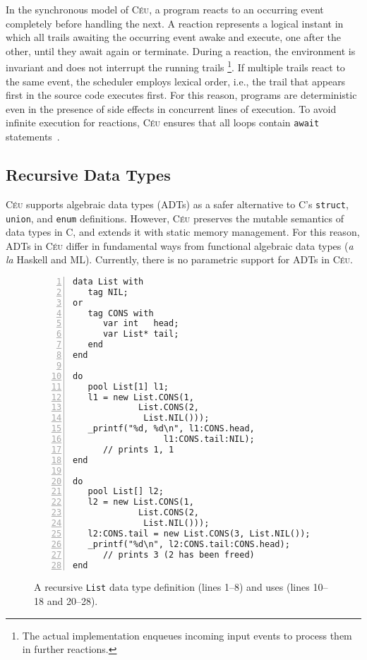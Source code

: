 \documentclass{acm_proc_article-sp}
\newcommand{\CEU}{\textsc{C\'{e}u}\xspace}
\newcommand{\code}[1] {{\small{\texttt{#1}}}}
\begin{document}
In the synchronous model of \CEU, a program reacts to an occurring event 
completely before handling the next.
%
A reaction represents a logical instant in which all trails awaiting the 
occurring event awake and execute, one after the other, until they await again 
or terminate.
%
During a reaction, the environment is invariant and does not interrupt the 
running trails%
\footnote{
The actual implementation enqueues incoming input events to process them in 
further reactions.
}.
If multiple trails react to the same event, the scheduler employs lexical 
order, i.e., the trail that appears first in the source code executes first.
%
For this reason, programs are deterministic even in the presence of side 
effects in concurrent lines of execution.
%
To avoid infinite execution for reactions, \CEU ensures that all loops contain 
\code{await} statements~\cite{ceu.sensys13}.

\subsection{Recursive Data Types}

\CEU supports algebraic data types (ADTs) as a safer alternative to C's 
\code{struct}, \code{union}, and \code{enum} definitions.
However, \CEU preserves the mutable semantics of data types in C, and extends 
it with static memory management.
For this reason, ADTs in \CEU differ in fundamental ways from functional 
algebraic data types (\emph{a la} Haskell and ML).
Currently, there is no parametric support for ADTs in \CEU.

\begin{figure}[t]
\begin{lstlisting}[numbers=left,xleftmargin=3em]
data List with
   tag NIL;
or
   tag CONS with
      var int   head;
      var List* tail;
   end
end

do
   pool List[1] l1;
   l1 = new List.CONS(1,
             List.CONS(2,
              List.NIL()));
   _printf("%d, %d\n", l1:CONS.head,
                  l1:CONS.tail:NIL);
      // prints 1, 1
end

do
   pool List[] l2;
   l2 = new List.CONS(1,
             List.CONS(2,
              List.NIL()));
   l2:CONS.tail = new List.CONS(3, List.NIL());
   _printf("%d\n", l2:CONS.tail:CONS.head);
      // prints 3 (2 has been freed)
end
\end{lstlisting}
\caption{
A recursive \code{List} data type definition (lines 1--8) and uses (lines 
10--18 and 20--28).
\label{lst.data.list}
}
\end{figure}
\end{document}
